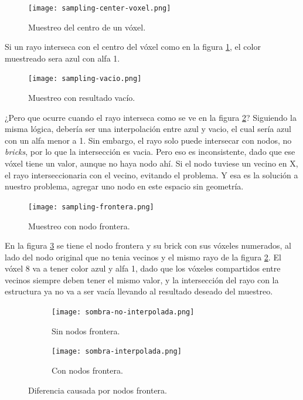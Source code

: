 \begin{figure}[h!]
    \centering
    \texttt{[image: sampling-center-voxel.png]}
    \caption{Muestreo del centro de un vóxel.}
    \label{fig:muestreo-centro-voxel}
\end{figure}

Si un rayo interseca con el centro del vóxel como en la figura \ref{fig:muestreo-centro-voxel}, el color muestreado sera azul con alfa 1.
\begin{figure}[h!]
    \centering
    \texttt{[image: sampling-vacio.png]}
    \caption{Muestreo con resultado vacío.}
    \label{fig:muestreo-vacio}
\end{figure}

¿Pero que ocurre cuando el rayo interseca como se ve en la figura \ref{fig:muestreo-vacio}?
Siguiendo la misma lógica, debería ser una interpolación entre azul y vacio, el cual sería azul con un alfa menor a 1.
Sin embargo, el rayo solo puede intersecar con nodos, no \textit{bricks}, por lo que la intersección es vacia.
Pero eso es inconsistente, dado que ese vóxel tiene un valor, aunque no haya nodo ahí.
Si el nodo tuviese un vecino en X, el rayo interseccionaria con el vecino, evitando el problema.
Y esa es la solución a nuestro problema, agregar uno nodo en este espacio sin geometría.

\begin{figure}[h!]
    \centering
    \texttt{[image: sampling-frontera.png]}
    \caption{Muestreo con nodo frontera.}
    \label{fig:muestreo-frontera}
\end{figure}

En la figura \ref{fig:muestreo-frontera} se tiene el nodo frontera y su brick con sus vóxeles numerados, al lado del nodo original que no tenia vecinos y el mismo rayo de la figura \ref{fig:muestreo-vacio}.
El vóxel 8 va a tener color azul y alfa 1, dado que los vóxeles compartidos entre vecinos siempre deben tener el mismo valor, y la intersección del rayo con la estructura ya no va a ser vacía llevando al resultado deseado del muestreo.

\begin{figure}
    \begin{subfigure}{.49\textwidth}
        \centering
        \texttt{[image: sombra-no-interpolada.png]}
        \caption{Sin nodos frontera.}
    \end{subfigure}
    \begin{subfigure}{.49\textwidth}
        \centering
        \texttt{[image: sombra-interpolada.png]}
        \caption{Con nodos frontera.}
    \end{subfigure}
    \caption{Diferencia causada por nodos frontera.}
    \label{fig:nodos_frontera}
\end{figure}

